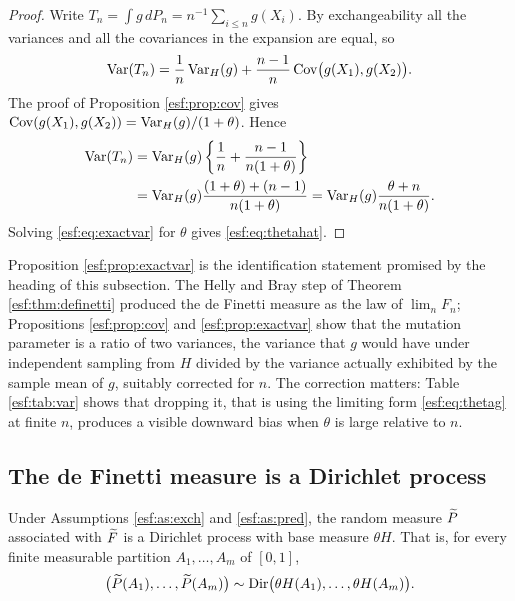 \begin{proof}
Write $T_n = \int g \, dP_n = n^{-1} \sum_{i \le n} g(X_i)$. By exchangeability all the
variances and all the covariances in the expansion are equal, so
\[
\operatorname{Var}(T_n) = \frac{1}{n} \operatorname{Var}_H(g) + \frac{n-1}{n} \operatorname{Cov}\bigl( g(X_1), g(X_2) \bigr).
\]
The proof of Proposition \ref{esf:prop:cov} gives $\operatorname{Cov}(g(X_1), g(X_2)) =
\operatorname{Var}_H(g)/(1+\theta)$. Hence
\[
\begin{aligned}
\operatorname{Var}(T_n) &= \operatorname{Var}_H(g) \left\{ \frac{1}{n} + \frac{n-1}{n(1+\theta)} \right\}\\
&= \operatorname{Var}_H(g) \frac{(1+\theta) + (n-1)}{n(1+\theta)}
= \operatorname{Var}_H(g) \frac{\theta+n}{n(1+\theta)} .
\end{aligned}
\]
Solving \eqref{esf:eq:exactvar} for $\theta$ gives \eqref{esf:eq:thetahat}.
\end{proof}

Proposition \ref{esf:prop:exactvar} is the identification statement promised by the heading of this subsection.
The Helly and Bray step of Theorem \ref{esf:thm:definetti} produced the de Finetti measure
as the law of $\lim_n F_n$; Propositions \ref{esf:prop:cov} and \ref{esf:prop:exactvar} show
that the mutation parameter is a ratio of two variances, the variance that $g$ would
have under independent sampling from $H$ divided by the variance actually exhibited by
the sample mean of $g$, suitably corrected for $n$. The correction matters: Table
\ref{esf:tab:var} shows that dropping it, that is using the limiting form
\eqref{esf:eq:thetag} at finite $n$, produces a visible downward bias when $\theta$ is
large relative to $n$.

\subsection{The de Finetti measure is a Dirichlet process}
\label{esf:sec:dp}

\begin{proposition}
\label{esf:prop:dp}
Under Assumptions \ref{esf:as:exch} and \ref{esf:as:pred}, the random measure $\widetilde{P}$
associated with $\widetilde{F}$ is a Dirichlet process with base measure $\theta H$. That is,
for every finite measurable partition $A_1, \dots, A_m$ of $[0,1]$,
\[
\bigl( \widetilde{P}(A_1), \dots, \widetilde{P}(A_m) \bigr)
\sim \operatorname{Dir}\bigl( \theta H(A_1), \dots, \theta H(A_m) \bigr).
\]
\end{proposition}


